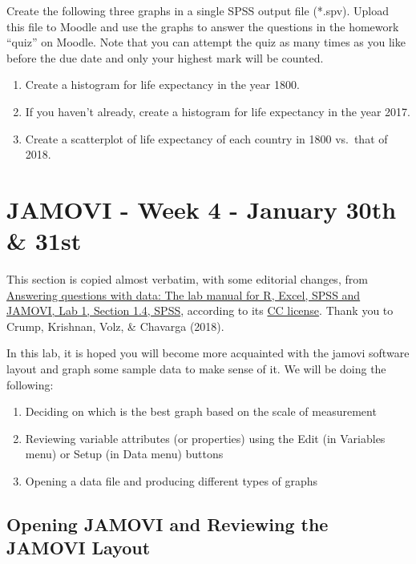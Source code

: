 \documentclass[
]{book}
\providecommand{\tightlist}{%
  \setlength{\itemsep}{0pt}\setlength{\parskip}{0pt}}
\begin{document}
Create the following three graphs in a single SPSS output file (*.spv). Upload this file to Moodle and use the graphs to answer the questions in the homework ``quiz'' on Moodle. Note that you can attempt the quiz as many times as you like before the due date and only your highest mark will be counted.

\begin{enumerate}
\def\labelenumi{\arabic{enumi}.}
\tightlist
\item
  Create a histogram for life expectancy in the year 1800.
\item
  If you haven't already, create a histogram for life expectancy in the year 2017.
\item
  Create a scatterplot of life expectancy of each country in 1800 vs.~that of 2018.
\end{enumerate}

\hypertarget{jamovi---week-4---january-30th-31st}{%
\section{JAMOVI - Week 4 - January 30th \& 31st}\label{jamovi---week-4---january-30th-31st}}

This section is copied almost verbatim, with some editorial changes, from \href{https://www.erinmazerolle.com/statisticsLab/lab-1-graphing-data.html\#spss-1}{Answering questions with data: The lab manual for R, Excel, SPSS and JAMOVI, Lab 1, Section 1.4, SPSS}, according to its \href{https://creativecommons.org/licenses/by-sa/4.0/deed.ast}{CC license}. Thank you to Crump, Krishnan, Volz, \& Chavarga (2018).

In this lab, it is hoped you will become more acquainted with the jamovi software layout and graph some sample data to make sense of it. We will be doing the following:

\begin{enumerate}
\def\labelenumi{\arabic{enumi}.}
\tightlist
\item
  Deciding on which is the best graph based on the scale of measurement
\item
  Reviewing variable attributes (or properties) using the Edit (in Variables menu) or Setup (in Data menu) buttons
\item
  Opening a data file and producing different types of graphs
\end{enumerate}

\hypertarget{opening-jamovi-and-reviewing-the-jamovi-layout}{%
\subsection{Opening JAMOVI and Reviewing the JAMOVI Layout}\label{opening-jamovi-and-reviewing-the-jamovi-layout}}
\end{document}
